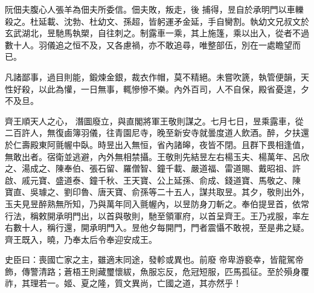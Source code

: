 \begin{pinyinscope}
 阮佃夫腹心人張羊為佃夫所委信。佃夫敗，叛走，後
 捕得，昱自於承明門以車轢殺之。杜延載、沈勃、杜幼文、孫超，皆躬運矛金延，手自臠割。執幼文兄叔文於玄武湖北，昱馳馬執槊，自往刺之。制露車一乘，其上施篷，乘以出入，從者不過數十人。羽儀追之恒不及，又各慮禍，亦不敢追尋，唯整部伍，別在一處瞻望而已。



 凡諸鄙事，過目則能，鍛煉金銀，裁衣作帽，莫不精絕。未嘗吹篪，執管便韻，天性好殺，以此為懽，一日無事，輒慘慘不樂。內外百司，人不自保，殿省憂遑，夕不及旦。



 齊王順天人之心，
 潛圖廢立，與直閣將軍王敬則謀之。七月七日，昱乘露車，從二百許人，無復鹵簿羽儀，往青園尼寺，晚至新安寺就曇度道人飲酒。醉，夕扶還於仁壽殿東阿氈幄中臥。時昱出入無恒，省內諸皞，夜皆不閉。且群下畏相逢值，無敢出者。宿衛並逃避，內外無相禁攝。王敬則先結昱左右楊玉夫、楊萬年、呂欣之、湯成之、陳奉伯、張石留、羅僧智、鐘千載、嚴道福、雷道賜、戴昭祖、許啟、戚元寶、盛道泰、鐘千秋、王天寶、公上延孫、俞成、錢道寶、馬敬之、陳
 寶直、吳璩之、劉印魯、唐天寶、俞孫等二十五人，謀共取昱。其夕，敬則出外，玉夫見昱醉熟無所知，乃與萬年同入氈幄內，以昱防身刀斬之。奉伯提昱首，依常行法，稱敕開承明門出，以首與敬則，馳至領軍府，以首呈齊王。王乃戎服，率左右數十人，稱行還，開承明門入。昱他夕每開門，門者震懾不敢視，至是弗之疑。齊王既入，曉，乃奉太后令奉迎安成王。



 史臣曰：喪國亡家之主，雖適末同途，發軫或異也。前廢
 帝卑游褻幸，皆龍駕帝飾，傳警清路；蒼梧王則藏璽懷紱，魚服忘反，危冠短服，匹馬孤征。至於殞身覆祚，其理若一。姬、夏之隆，質文異尚，亡國之道，其亦然乎！



\end{pinyinscope}